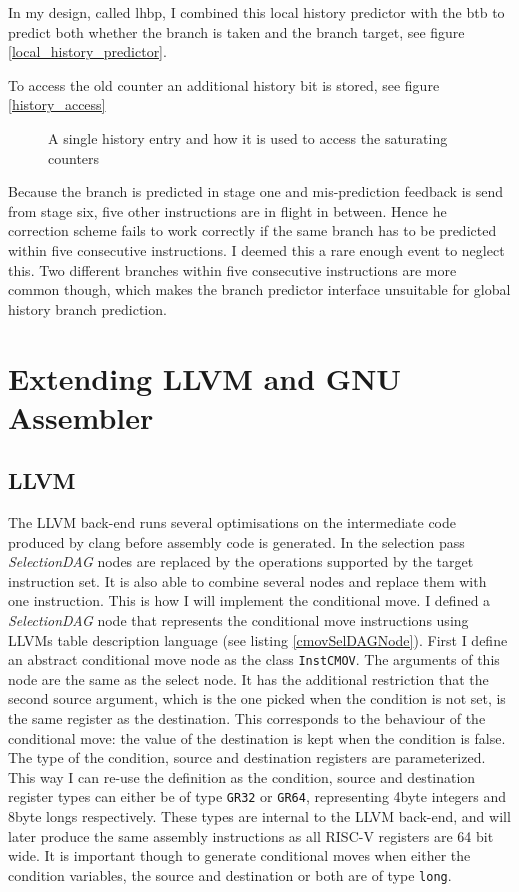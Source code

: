 \documentclass[12pt,twoside,notitlepage]{report}
\begin{document}
In my design, called \gls{lhbp}, I combined this local history predictor with the \gls{btb} to predict both whether the branch is taken and the branch target, see figure \ref{local_history_predictor}. 


To access the old counter an additional history bit is stored, see figure \ref{history_access} 
\begin{figure}[htp]
\centering
\caption{A single history entry and how it is used to access the saturating counters}
\end{figure}

Because the branch is predicted in stage one and mis-prediction feedback is send from stage six, five other instructions are in flight in between. Hence he correction scheme fails to work correctly if the same branch has to be predicted within five consecutive instructions. I deemed this a rare enough event to neglect this. Two different branches within five consecutive instructions are more common though, which makes the branch predictor interface unsuitable for global history branch prediction.

\section{Extending LLVM and GNU Assembler}

\subsection{LLVM}

The LLVM back-end runs several optimisations on the intermediate code produced by clang before assembly code is generated. In the selection pass \textit{SelectionDAG} nodes are replaced by the operations supported by the target instruction set. It is also able to combine several nodes and replace them with one instruction. This is how I will implement the conditional move.
I defined a \textit{SelectionDAG} node that represents the conditional move instructions using LLVMs table description language (see listing \ref{cmovSelDAGNode}). First I define an abstract conditional move node as the class \texttt{InstCMOV}. The arguments of this node are the same as the select node. It has the additional restriction that the second source argument, which is the one picked when the condition is not set, is the same register as the destination. This corresponds to the behaviour of the conditional move: the value of the destination is kept when the condition is false. The type of the condition, source and destination registers are parameterized. This way I can re-use the definition as the condition, source and destination register types can either be of type \texttt{GR32} or \texttt{GR64}, representing 4byte integers and 8byte longs respectively. These types are internal to the LLVM back-end, and will later produce the same assembly instructions as all RISC-V registers are 64 bit wide. It is important though to generate conditional moves when either the condition variables, the source and destination or both are of type \texttt{long}. 
\end{document}
